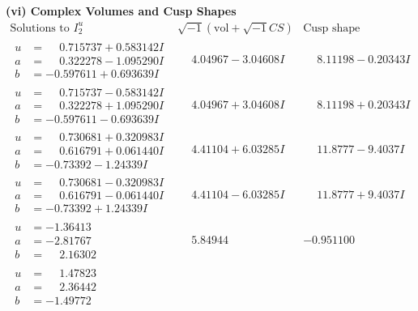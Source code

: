 \documentclass[1p]{elsarticle_modified}
\theoremstyle{definition}
\newcommand{\I}{\sqrt{-1}}
\begin{document}
\newpage\flushleft \textbf{(vi) Complex Volumes and Cusp Shapes}
$$\begin{array}{c|c|c}  
\text{Solutions to }I^u_{2}& \I (\text{vol} + \sqrt{-1}CS) & \text{Cusp shape}\\
 \hline 
\begin{aligned}
u &= \phantom{-}0.715737 + 0.583142 I \\
a &= \phantom{-}0.322278 - 1.095290 I \\
b &= -0.597611 + 0.693639 I\end{aligned}
 & \phantom{-}4.04967 - 3.04608 I & \phantom{-}8.11198 - 0.20343 I \\ \hline\begin{aligned}
u &= \phantom{-}0.715737 - 0.583142 I \\
a &= \phantom{-}0.322278 + 1.095290 I \\
b &= -0.597611 - 0.693639 I\end{aligned}
 & \phantom{-}4.04967 + 3.04608 I & \phantom{-}8.11198 + 0.20343 I \\ \hline\begin{aligned}
u &= \phantom{-}0.730681 + 0.320983 I \\
a &= \phantom{-}0.616791 + 0.061440 I \\
b &= -0.73392 - 1.24339 I\end{aligned}
 & \phantom{-}4.41104 + 6.03285 I & \phantom{-}11.8777 - 9.4037 I \\ \hline\begin{aligned}
u &= \phantom{-}0.730681 - 0.320983 I \\
a &= \phantom{-}0.616791 - 0.061440 I \\
b &= -0.73392 + 1.24339 I\end{aligned}
 & \phantom{-}4.41104 - 6.03285 I & \phantom{-}11.8777 + 9.4037 I \\ \hline\begin{aligned}
u &= -1.36413\phantom{ +0.000000I} \\
a &= -2.81767\phantom{ +0.000000I} \\
b &= \phantom{-}2.16302\phantom{ +0.000000I}\end{aligned}
 & \phantom{-}5.84944\phantom{ +0.000000I} & -0.951100\phantom{ +0.000000I} \\ \hline\begin{aligned}
u &= \phantom{-}1.47823\phantom{ +0.000000I} \\
a &= \phantom{-}2.36442\phantom{ +0.000000I} \\
b &= -1.49772\phantom{ +0.000000I}\end{aligned}

\end{array}$$
\end{document}
